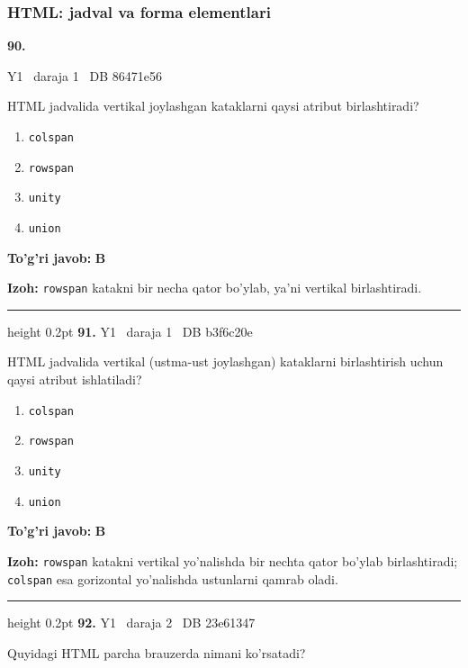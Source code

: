 \documentclass[10pt,a4paper,oneside]{article}
\begin{document}
\subsubsection{HTML: jadval va forma elementlari}
\hypertarget{q90}{\textbf{\color{ink}90.}}  {\color{muted}\scriptsize Y1 \textbullet\ daraja 1 \textbullet\ DB 86471e56}
\par
HTML jadvalida vertikal joylashgan kataklarni qaysi atribut birlashtiradi?
\begin{enumerate}[label=\Alph*),leftmargin=9mm]
\item \texttt{colspan}
\item \texttt{rowspan}
\item \texttt{unity}
\item \texttt{union}
\end{enumerate}
\begin{tcolorbox}[enhanced,breakable,colback=teal!4,colframe=teal!45!black,boxrule=0.45pt,arc=1.2mm,left=2.8mm,right=2.8mm,top=2mm,bottom=2mm,before skip=2mm,after skip=2mm]
\textbf{\color{teal}To'g'ri javob:} \textbf{B}
\par\smallskip
\textbf{Izoh:} \texttt{rowspan} katakni bir necha qator bo'ylab, ya'ni vertikal birlashtiradi.
\end{tcolorbox}
\vspace{2mm}\hrule height 0.2pt \vspace{4mm}
\hypertarget{q91}{\textbf{\color{ink}91.}}  {\color{muted}\scriptsize Y1 \textbullet\ daraja 1 \textbullet\ DB b3f6c20e}
\par
HTML jadvalida vertikal (ustma-ust joylashgan) kataklarni birlashtirish uchun qaysi atribut ishlatiladi?
\begin{enumerate}[label=\Alph*),leftmargin=9mm]
\item \texttt{colspan}
\item \texttt{rowspan}
\item \texttt{unity}
\item \texttt{union}
\end{enumerate}
\begin{tcolorbox}[enhanced,breakable,colback=teal!4,colframe=teal!45!black,boxrule=0.45pt,arc=1.2mm,left=2.8mm,right=2.8mm,top=2mm,bottom=2mm,before skip=2mm,after skip=2mm]
\textbf{\color{teal}To'g'ri javob:} \textbf{B}
\par\smallskip
\textbf{Izoh:} \texttt{rowspan} katakni vertikal yo'nalishda bir nechta qator bo'ylab birlashtiradi; \texttt{colspan} esa gorizontal yo'nalishda ustunlarni qamrab oladi.
\end{tcolorbox}
\vspace{2mm}\hrule height 0.2pt \vspace{4mm}
\hypertarget{q92}{\textbf{\color{ink}92.}}  {\color{muted}\scriptsize Y1 \textbullet\ daraja 2 \textbullet\ DB 23e61347}
\par
Quyidagi HTML parcha brauzerda nimani ko'rsatadi?
\end{document}
